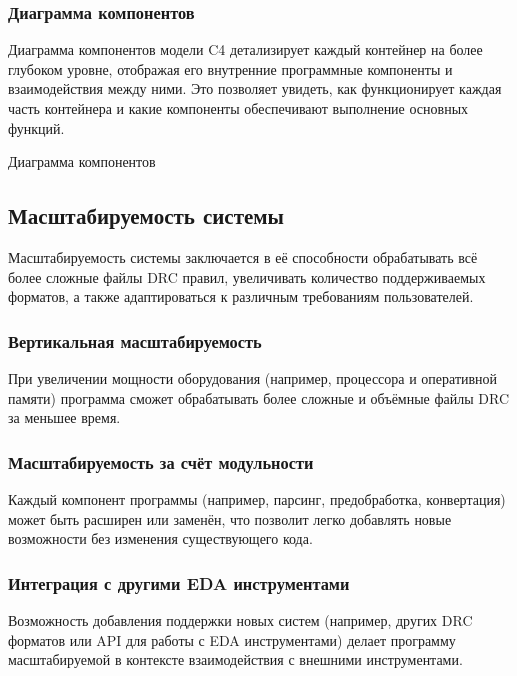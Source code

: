 \subsubsection{Диаграмма компонентов}

Диаграмма компонентов модели C4 детализирует
каждый контейнер на более глубоком уровне,
отображая его внутренние программные компоненты и взаимодействия между ними.
Это позволяет увидеть, как функционирует каждая часть контейнера
и какие компоненты обеспечивают выполнение основных функций.

\begin{image}
	\caption{Диаграмма компонентов}
	\label{fig:c4:components}
\end{image}

\subsection{Масштабируемость системы}

Масштабируемость системы заключается в её способности обрабатывать
всё более сложные файлы DRC правил,
увеличивать количество поддерживаемых форматов,
а также адаптироваться к различным требованиям пользователей.

\subsubsection{Вертикальная масштабируемость}

При увеличении мощности оборудования
(например, процессора и оперативной памяти)
программа сможет обрабатывать более сложные
и объёмные файлы DRC за меньшее время.
  
\subsubsection{Масштабируемость за счёт модульности}

Каждый компонент программы (например, парсинг, предобработка, конвертация)
может быть расширен или заменён,
что позволит легко добавлять новые возможности
без изменения существующего кода.
  
\subsubsection{Интеграция с другими EDA инструментами}

Возможность добавления поддержки новых систем
(например, других DRC форматов или API для работы с EDA инструментами)
делает программу масштабируемой
в контексте взаимодействия с внешними инструментами.


